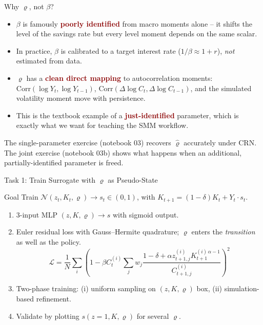 \documentclass[10pt,aspectratio=169]{beamer}
\newcommand{\emphc}[1]{\textbf{\textcolor{darkred}{#1}}}
\begin{document}
\begin{frame}{Why $\varrho$, not $\beta$?}
\small
\begin{itemize}
  \item $\beta$ is famously \emphc{poorly identified} from macro moments alone -- it shifts the level of the savings rate but every level moment depends on the same scalar.
  \item In practice, $\beta$ is calibrated to a target interest rate ($1/\beta \approx 1+r$), \emph{not} estimated from data.
  \item $\varrho$ has a \emphc{clean direct mapping} to autocorrelation moments: $\mathrm{Corr}(\log Y_t, \log Y_{t-1})$, $\mathrm{Corr}(\Delta\log C_t, \Delta\log C_{t-1})$, and the simulated volatility moment move with persistence.
  \item This is the textbook example of a \emphc{just-identified} parameter, which is exactly what we want for teaching the SMM workflow.
\end{itemize}
\vspace{0.2cm}
The single-parameter exercise (notebook 03) recovers $\hat\varrho$ accurately under CRN. The joint exercise (notebook 03b) shows what happens when an additional, partially-identified parameter is freed.
\end{frame}

\begin{frame}{Task 1: Train Surrogate with $\varrho$ as Pseudo-State}
\begin{block}{Goal}
Train $\mathcal{N}(z_t, K_t, \varrho) \to s_t \in (0,1)$, with $K_{t+1} = (1-\delta)K_t + Y_t \cdot s_t$.
\end{block}
\begin{enumerate}
  \itemsep1pt
  \item 3-input MLP $(z, K, \varrho) \to s$ with sigmoid output.
  \item Euler residual loss with Gauss--Hermite quadrature; $\varrho$ enters the \emph{transition} as well as the policy.
  {\small\[
  \mathcal{L} = \frac{1}{N}\sum_i \!\left(1 - \beta C^{(i)}_t \sum_j w_j \frac{1-\delta + \alpha z^{(i)}_{t+1,j} K^{(i)\,\alpha-1}_{t+1}}{C^{(i)}_{t+1,j}}\right)^{\!2}
  \]}
  \vspace{-10pt}
  \item Two-phase training: (i) uniform sampling on $(z, K, \varrho)$ box, (ii) simulation-based refinement.
  \item Validate by plotting $s(z=1, K, \varrho)$ for several $\varrho$.
\end{enumerate}
\end{frame}
\end{document}
